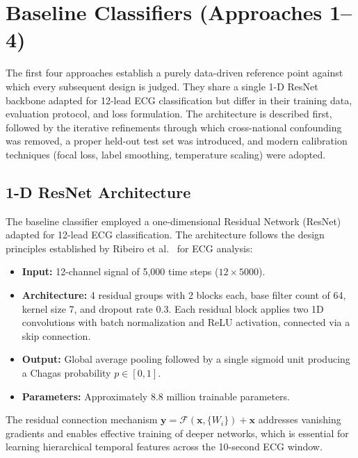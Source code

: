 
\section{Baseline Classifiers (Approaches 1--4)}
\label{sec:baseline}

The first four approaches establish a purely data-driven reference point against which every subsequent design is judged. They share a single 1-D ResNet backbone adapted for 12-lead ECG classification but differ in their training data, evaluation protocol, and loss formulation. The architecture is described first, followed by the iterative refinements through which cross-national confounding was removed, a proper held-out test set was introduced, and modern calibration techniques (focal loss, label smoothing, temperature scaling) were adopted.

\subsection{1-D ResNet Architecture}

The baseline classifier employed a one-dimensional Residual Network (ResNet)~\cite{he2016deep} adapted for 12-lead ECG classification. The architecture follows the design principles established by Ribeiro et al.~\cite{ribeiro2020automatic} for ECG analysis:

\begin{itemize}
    \item \textbf{Input:} 12-channel signal of 5,000 time steps ($12 \times 5000$).
    \item \textbf{Architecture:} 4 residual groups with 2 blocks each, base filter count of 64, kernel size 7, and dropout rate 0.3. Each residual block applies two 1D convolutions with batch normalization and ReLU activation, connected via a skip connection.
    \item \textbf{Output:} Global average pooling followed by a single sigmoid unit producing a Chagas probability $p \in [0, 1]$.
    \item \textbf{Parameters:} Approximately 8.8 million trainable parameters.
\end{itemize}
The residual connection mechanism $\mathbf{y} = \mathcal{F}(\mathbf{x}, \{W_i\}) + \mathbf{x}$ addresses vanishing gradients and enables effective training of deeper networks, which is essential for learning hierarchical temporal features across the 10-second ECG window.

